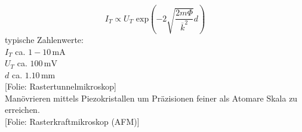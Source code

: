 \documentclass[titlepage,11pt,a4paper,ngerman]{report}
\newcommand{\tx}[1]{\textrm{#1}}
\newcommand{\ol}[1]{\overline{#1}}
\renewcommand{\Phi}{\varPhi}
\newcommand{\folie}[1]{\color{gray}[Folie: #1]\color{black}}
\newcommand{\lcom}[1]{\color{MidnightBlue}#1\color{black}}
\begin{document}
\begin{equation*}
I_T \propto U_T \tx{ exp}\left(- 2\sqrt{\frac{2 m \Phi}{\ol{k}^2}} d \right)
\end{equation*}
typische Zahlenwerte:\\
$ I_T $ ca. $ 1 - 10 \, \tx{mA} $\\
$ U_T $ ca. $ 100 \, \tx{mV} $\\
$ d $ ca. $ 1 . 10 \, \tx{mm} $\\
\folie{Rastertunnelmikroskop}\\
\lcom{Manövrieren mittels Piezokristallen um Präzisionen feiner als Atomare Skala zu erreichen.}\\
\folie{Rasterkraftmikroskop (AFM)}















%
%
\end{document}
